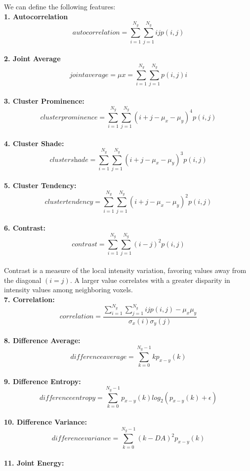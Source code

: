 We can define the following features: \\
\textbf{1. Autocorrelation}\\
\[\textit{autocorrelation}=\sum _{i=1}^{N_{g}}\sum _{j=1}^{N_{g}}ijp\left(i,j\right)\]\\
\textbf{2. Joint Average}\\
\[\textit{jointaverage}=\mu x=\sum _{i=1}^{N_{g}}\sum _{j=1}^{N_{g}}p\left(i,j\right)i\]\\
\textbf{3. Cluster Prominence:}\\
\[\textit{clusterprominence}=\sum _{i=1}^{N_{g}}\sum _{j=1}^{N_{g}}\left(i+j-\mu _{x}-\mu _{y}\right)^{4}p\left(i,j\right)\]\\
\textbf{4. Cluster Shade:}\\
\[\textit{clustershade}=\sum _{i=1}^{N_{g}}\sum _{j=1}^{N_{g}}\left(i+j-\mu _{x}-\mu _{y}\right)^{3}p\left(i,j\right)\]\\
\textbf{5. Cluster Tendency:}\\
\[\textit{clustertendency}=\sum _{i=1}^{N_{g}}\sum _{j=1}^{N_{g}}\left(i+j-\mu _{x}-\mu _{y}\right)^{2}p\left(i,j\right)\]\\
\textbf{6. Contrast:}\\
\[\textit{contrast}=\sum _{i=1}^{N_{g}}\sum _{j=1}^{N_{g}}\left(i-j\right)^{2}p\left(i,j\right)\]\\
Contrast is a measure of the local intensity variation, favoring values away from the diagonal $\left(i=j\right)$. A larger value correlates with a greater disparity in intensity values among neighboring voxels.\\
\textbf{7. Correlation:}\\
\[\textit{correlation}=\frac{\sum _{i=1}^{N_{g}}\sum _{j=1}^{N_{g}}ijp\left(i,j\right)-\mu _{x}\mu _{y}}{\sigma _{x}\left(i\right)\sigma _{y}\left(j\right)}\]\\
\textbf{8. Difference Average:}\\
\[\textit{differenceaverage}=\sum _{k=0}^{N_{g}-1}kp_{x-y}\left(k\right)\]\\
\textbf{9. Difference Entropy:}\\
\[\textit{differenceentropy}=\sum _{k=0}^{N_{g}-1}p_{x-y}\left(k\right)log_{2}\left(p_{x-y}\left(k\right)+\epsilon \right)\]\\
\textbf{10. Difference Variance:}\\
\[\textit{differencevariance}=\sum _{k=0}^{N_{g}-1}{\left(k-DA\right)^{2}}p_{x-y}\left(k\right)\]\\
\textbf{11. Joint Energy:}\\
